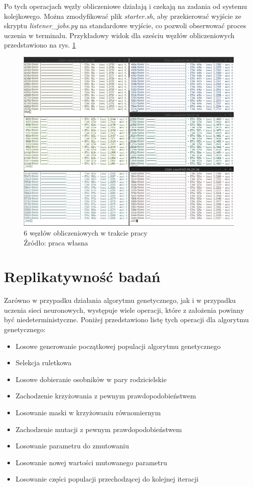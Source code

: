 Po tych operacjach węzły obliczeniowe działają i czekają na zadania od systemu kolejkowego.
Można zmodyfikować plik \textit{starter.sh}, aby przekierować wyjście ze skryptu \textit{listener\_jobs.py} na standardowe wyjście, co pozwoli obserwować proces uczenia w terminalu.
Przykładowy widok dla sześciu węzłów obliczeniowych przedstawiono na rys. \ref{fig:wip}

\begin{figure}[h!tb]
	 \centering
	 \includegraphics[width = 1.0\linewidth]{img/wip}
	 \caption{6 węzłów obliczeniowych w trakcie pracy \\
              Źródło: praca własna}
	 \label{fig:wip}
\end{figure}

\section{Replikatywność badań}\label{sec:replicativity}
Zarówno w przypadku działania algorytmu genetycznego, jak i w przypadku uczenia sieci neuronowych, występuje wiele operacji, które z założenia powinny być niedeterministyczne.
Poniżej przedstawiono listę tych operacji dla algorytmu genetycznego:
\begin{itemize}
  \item Losowe generowanie początkowej populacji algorytmu genetycznego
  \item Selekcja ruletkowa
  \item Losowe dobieranie osobników w pary rodzicielskie
  \item Zachodzenie krzyżowania z pewnym prawdopodobieństwem
  \item Losowanie maski w krzyżowaniu równomiernym
  \item Zachodzenie mutacji z pewnym prawdopodobieństwem
  \item Losowanie parametru do zmutowaniu
  \item Losowanie nowej wartości mutowanego parametru
  \item Losowanie części populacji przechodzącej do kolejnej iteracji
\end{itemize}

